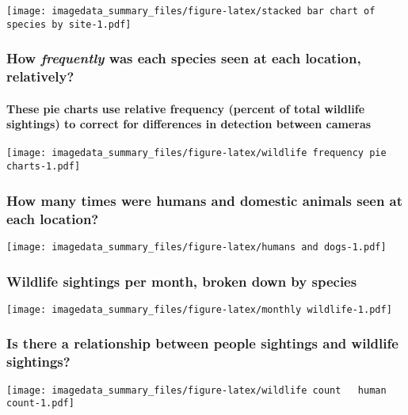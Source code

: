 \documentclass[
]{article}
\begin{document}
\texttt{[image: imagedata\_summary\_files/figure-latex/stacked bar chart of species by site-1.pdf]}

\subsubsection{\texorpdfstring{How \emph{frequently} was each species
seen at each location,
relatively?}{How frequently was each species seen at each location, relatively?}}\label{how-frequently-was-each-species-seen-at-each-location-relatively}

\paragraph{These pie charts use relative frequency (percent of total
wildlife sightings) to correct for differences in detection between
cameras}\label{these-pie-charts-use-relative-frequency-percent-of-total-wildlife-sightings-to-correct-for-differences-in-detection-between-cameras}

\texttt{[image: imagedata\_summary\_files/figure-latex/wildlife frequency pie charts-1.pdf]}

\subsubsection{How many times were humans and domestic animals seen at
each
location?}\label{how-many-times-were-humans-and-domestic-animals-seen-at-each-location}

\texttt{[image: imagedata\_summary\_files/figure-latex/humans and dogs-1.pdf]}

\subsubsection{Wildlife sightings per month, broken down by
species}\label{wildlife-sightings-per-month-broken-down-by-species}

\texttt{[image: imagedata\_summary\_files/figure-latex/monthly wildlife-1.pdf]}

\subsubsection{Is there a relationship between people sightings and
wildlife
sightings?}\label{is-there-a-relationship-between-people-sightings-and-wildlife-sightings}

\texttt{[image: imagedata\_summary\_files/figure-latex/wildlife count ~ human count-1.pdf]}
\end{document}

